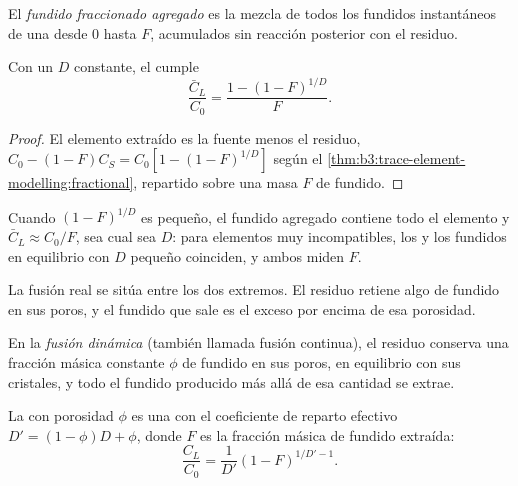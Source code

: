 \begin{definition}\label{def:b3:trace-element-modelling:fractional}
El \emph{fundido fraccionado agregado} es la
mezcla de todos los fundidos instantáneos de una  desde $0$ hasta
$F$, acumulados sin reacción posterior con el residuo.
\end{definition}

\begin{proposition}
\label{prop:b3:trace-element-modelling:aggregate}
Con un $D$ constante, el  cumple
\[
\frac{\bar C_L}{C_0} = \frac{1 - (1 - F)^{1/D}}{F}.
\]
\end{proposition}

\begin{proof}
El elemento extraído es la fuente menos el residuo,
$C_0 - (1 - F)C_S = C_0[1 - (1 - F)^{1/D}]$ según el \cref{thm:b3:trace-element-modelling:fractional},
repartido sobre una masa $F$ de fundido.
\end{proof}

Cuando $(1 - F)^{1/D}$ es pequeño, el fundido agregado contiene todo el
elemento y $\bar C_L \approx C_0/F$, sea cual sea $D$: para elementos muy
incompatibles, los  y los fundidos en equilibrio
con $D$ pequeño coinciden, y ambos miden $F$.

La fusión real se sitúa entre los dos extremos. El residuo retiene algo de
fundido en sus poros, y el fundido que sale es el exceso por encima de esa porosidad.

\begin{definition}\label{def:b3:trace-element-modelling:dynamic}
En la \emph{fusión dinámica} (también llamada fusión
continua), el residuo conserva una fracción másica constante $\phi$ de fundido en
sus poros, en equilibrio con sus cristales, y todo el fundido producido más allá de
esa cantidad se extrae.
\end{definition}

\begin{proposition}\label{prop:b3:trace-element-modelling:dynamic}
La  con porosidad $\phi$ es una  con el
coeficiente de reparto efectivo $D' = (1 - \phi)D + \phi$, donde $F$ es la
fracción másica de fundido extraída:
\[
\frac{C_L}{C_0} = \frac{1}{D'}(1 - F)^{1/D' - 1}.
\]
\end{proposition}

